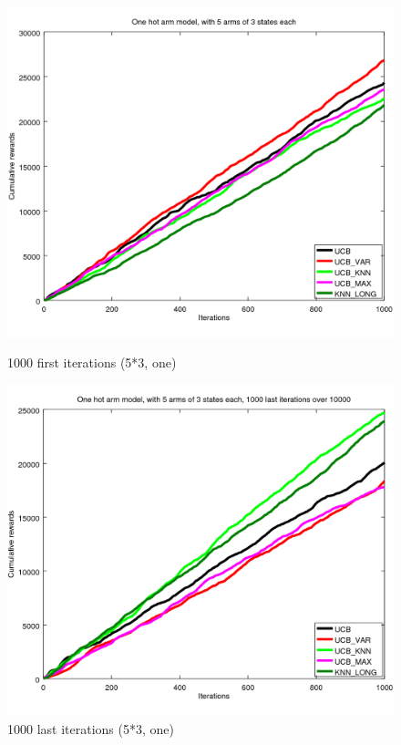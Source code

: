 \documentclass{article} %
\begin{document}
\begin{figure}[h]
	\begin{minipage}[b]{.49\linewidth}
		\includegraphics[width=1.0\textwidth]{begin_s_1000it.png}
		\caption{1000 first iterations (5*3, one)}
	\end{minipage}
	\hfill
	\begin{minipage}[b]{0.49\linewidth}
		\includegraphics[width=1.0\textwidth]{last_s_1000it.png}
		\caption{1000 last iterations (5*3, one)}
	\end{minipage}
	\label{fig:f}
\end{figure}
\end{document}

